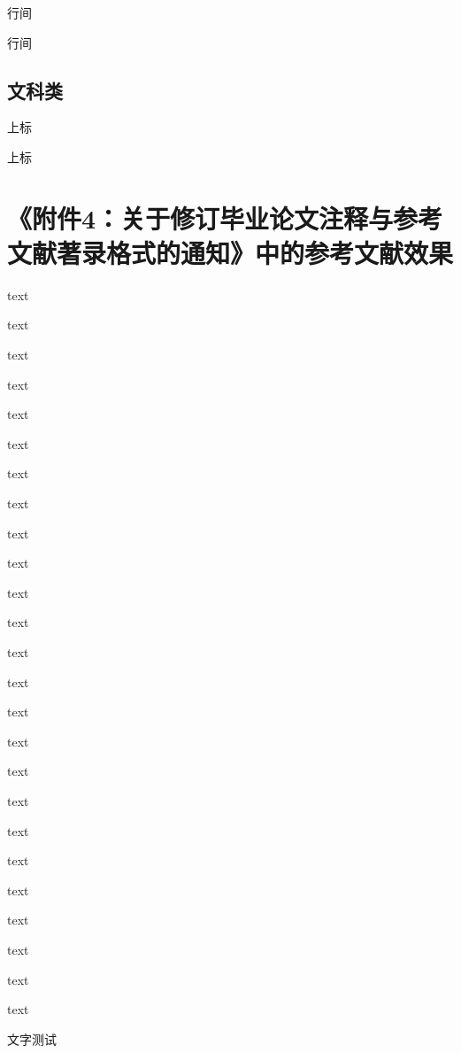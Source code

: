 行间\parencite[thm 3.1]{zurek2014quantum}

行间\parencite{zurek2014quantum}



\subsection{文科类}

上标\cite[test]{zurek2014quantum}

上标\cite{zurek2014quantum}



\section{《附件4：关于修订毕业论文注释与参考文献著录格式的通知》中的参考文献效果}

  text\parencite{李晓东rawtype}

  text\parencite{Ahnrawtype}

  text\parencite{Ahnrawtype}

  text\parencite{丁文祥rawtype}

  text\parencite{邱泽奇会议论文集rawtype}

  text\parencite{雷光春rawtype}

  text\parencite{zhangrawtype}

  text\parencite{邱泽奇会议论文rawtype}

  text\parencite{马克思rawtype}

  text\parencite{昂温rawtype}

  text\parencite{Fothrawtype}

  text\parencite{杨国枢rawtype}

  text\parencite{Morisonrawtype}

  text\parencite{张志祥rawtype}

  text\parencite{徐秀英rawtype}

  text\parencite{Aldemitarawtype}

  text\parencite{张凯军rawtype}

  text\parencite{Kosekrawtype}

  text\parencite{文献编写rawtype}

  text\parencite{国防白皮rawtype}

  text\parencite{federalrawtype}

  text\parencite{healthrawtype}

  text\parencite{江向东rawtype}

  text\parencite{萧钮rawtype}

  text\parencite{Dublinrawtype}

文字测试